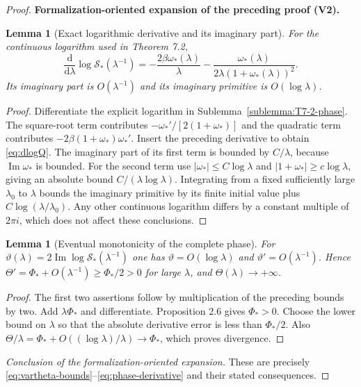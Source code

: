 \documentclass[11pt]{article}
\newtheorem{lemma}[theorem]{Lemma}
\newcommand{\formalisationparentid}{X}
\newenvironment{formalisationaddition}[1]{\par\medskip\begingroup\color{blue}\def\formalisationparentid{#1}\setcounter{formalizationsublemma}{0}\let\lemma\formalizationsublemma\let\endlemma\endformalizationsublemma
  \def\Eo{\mathcal E_h^\circ}\def\EE{\mathcal E_h}\def\phio{\phi_h^\circ}\def\phih{\phi_h}\def\Ho{H_h^{\rm atom}(v^\circ)}\def\Ha{H_h^{\rm atom}}\def\HL{H_h^{L}}\def\Dh{D_h}\def\Log{\operatorname{Log}}\def\ellh{\ell_h}\def\Gp{G_{p,h}}\def\Ast{A_{*,h}}\def\ahat{\widehat{\mathfrak a}_h}\def\ah{\mathfrak a_h}\def\rh{\widehat\rho_h}\def\deltah{\widehat\delta_h}\def\oldref##1{\textup{(##1)}}\def\interface##1{\par\noindent\textit{Analytical interface used here.} ##1\par}\def\finish{\par\noindent\textit{Conclusion of the formalization-oriented expansion.} }\par\noindent\textbf{Formalization-oriented expansion of the preceding proof (V2).}\par\smallskip
}{\par\endgroup\medskip
}
\newcommand{\Ima}{\operatorname{Im}}
\begin{document}
\begin{proof}
\begin{formalisationaddition}{L7.3}
\begin{lemma}[Exact logarithmic derivative and its imaginary part]\label{sublemma:L7-3-log-derivative}
For the continuous logarithm used in Theorem 7.2,
\begin{equation*}
 \frac{\mathrm d}{\mathrm d\lambda}\log \mathcal S_*(\lambda^{-1})
 =-\frac{2\beta\omega_*(\lambda)}{\lambda}
 -\frac{\omega_*(\lambda)}{2\lambda(1+\omega_*(\lambda))^2}.
\end{equation*}
Its imaginary part is $O(\lambda^{-1})$ and its imaginary primitive is $O(\log\lambda)$.
\end{lemma}
\begin{proof}
Differentiate the explicit logarithm in Sublemma~\ref{sublemma:T7-2-phase}. The square-root term contributes $-\omega_*'/[2(1+\omega_*)]$ and the quadratic term contributes $-2\beta(1+\omega_*)\omega_*'$. Insert the preceding derivative to obtain \eqref{eq:dlogQ}. The imaginary part of its first term is bounded by $C/\lambda$, because $\Ima\omega_*$ is bounded. For the second term use $|\omega_*|\le C\log\lambda$ and $|1+\omega_*|\ge c\log\lambda$, giving an absolute bound $C/(\lambda\log\lambda)$. Integrating from a fixed sufficiently large $\lambda_0$ to $\lambda$ bounds the imaginary primitive by its finite initial value plus $C\log(\lambda/\lambda_0)$. Any other continuous logarithm differs by a constant multiple of $2\pi i$, which does not affect these conclusions.
\end{proof}

\begin{lemma}[Eventual monotonicity of the complete phase]\label{sublemma:L7-3-monotonicity}
For $\vartheta(\lambda)=2\Ima\log \mathcal S_*(\lambda^{-1})$ one has $\vartheta=O(\log\lambda)$ and $\vartheta'=O(\lambda^{-1})$. Hence $\Theta'=\Phi_*+O(\lambda^{-1})\ge\Phi_*/2>0$ for large $\lambda$, and $\Theta(\lambda)\to+\infty$.
\end{lemma}
\begin{proof}
The first two assertions follow by multiplication of the preceding bounds by two. Add $\lambda\Phi_*$ and differentiate. Proposition 2.6 gives $\Phi_*>0$. Choose the lower bound on $\lambda$ so that the absolute derivative error is less than $\Phi_*/2$. Also $\Theta/\lambda=\Phi_*+O((\log\lambda)/\lambda)\to\Phi_*$, which proves divergence.
\end{proof}
\finish These are precisely \eqref{eq:vartheta-bounds}--\eqref{eq:phase-derivative} and their stated consequences.
\end{formalisationaddition}

\end{proof}
\end{document}
